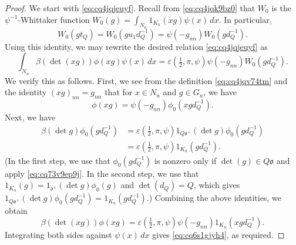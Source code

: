 \documentclass[reqno]{amsart}
\theoremstyle{plain}
\theoremstyle{definition}
\begin{document}
\begin{proof}
  We start with \eqref{eq:cq4jqjeuyf}.  Recall from \eqref{eq:cq4jqk9bz0} that $W_0$ is the $\psi^{-1}$-Whittaker function $W_0(g) = \int_{N_n} 1_{K_n}(x g) \psi(x) \, d x$.  In particular,
  \begin{equation}\label{eq:cq4jqk3rcx}
    W_0(g t_{Q}) = W_0(g u_1 d_{Q}^{-1}) = \psi(-g_{n n}) W_0(g d_{Q}^{-1}).
  \end{equation}
  Using this identity, we may rewrite the desired relation \eqref{eq:cq4jqjeuyf} as
  \begin{equation}\label{eq:cq6s1gjyh4}
    \int_{N_n} \beta(\det (x g)) \phi(x g) \psi(x) \, d x = \varepsilon(\tfrac{1}{2}, \pi, \psi) \psi(- g_{n n}) W_0(g d_{Q}^{-1}).
  \end{equation}
  We verify this as follows.  First, we see from the definition \eqref{eq:cq4jqv74tm} and the identity $(xg)_{nn} = g_{nn}$ that for $x \in N_n$ and $g \in G_n$, we have
  \begin{equation}\label{eq:relation-phi-phi0}
    \phi(x g) = \psi(- g_{n n}) \phi_0(x g d_Q^{-1}).
  \end{equation}
  Next, we have
  \begin{align*}
    \beta(\det g) \phi_0(g d_Q^{-1}) &= \varepsilon(\tfrac{1}{2}, \pi, \psi)
                                1_{Q \mathfrak{o}^\times}(\det g)
                                \phi_0(g d_Q^{-1}) \\
                              &=
                                \varepsilon(\tfrac{1}{2}, \pi, \psi)
                                1_{K_n}(g d_Q^{-1}).
  \end{align*}
  (In the first step, we use that $\phi_0(g d_Q^{-1})$ is nonzero only if $\det(g) \in Q \mathfrak{o}$ and apply \eqref{eq:cq73v9ep9j}.  In the second step, we use that $1_{K_n}(g) = 1_{\mathfrak{o}^\times}(\det g) \phi_0(g)$ and $\det(d_Q) = Q$, which gives $1_{Q \mathfrak{o}^\times}(\det g) \phi_0(g d_Q^{-1}) = 1_{K_n}(g d_Q^{-1})$.)  Combining the above identities, we obtain
  \begin{equation*}
    \beta(\det(x g)) \phi(x g) = \varepsilon(\tfrac{1}{2}, \pi, \psi) \psi(- g_{n n}) 1_{K_n}(x g d_Q^{-1}).
  \end{equation*}
  Integrating both sides against $\psi(x) \, d x$ gives \eqref{eq:cq6s1gjyh4}, as required.


\end{proof}
\end{document}
